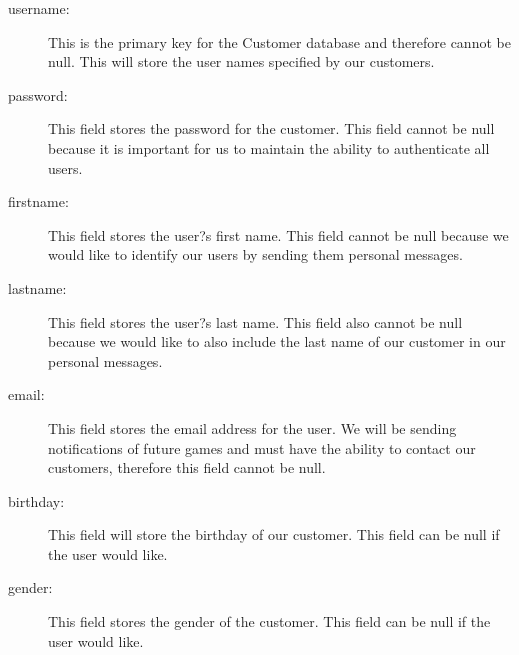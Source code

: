 \begin{description}
    \item[username:] This is the primary key for the Customer database and therefore cannot be null. This will store the user names specified by our customers.
    \item[password:] This field stores the password for the customer. This field cannot be null because it is important for us to maintain the ability to authenticate all users.
    \item[firstname:] This field stores the user?s first name. This field cannot be null because we would like to identify our users by sending them personal messages.
    \item[lastname:] This field stores the user?s last name. This field also cannot be null because we would like to also include the last name of our customer in our personal messages.
    \item[email:] This field stores the email address for the user. We will be sending notifications of future games and must have the ability to contact our customers, therefore this field cannot be null.
	\item[birthday:] This field will store the birthday of our customer. This field can be null if the user would like.
	\item[gender:] This field stores the gender of the customer. This field can be null if the user would like.
\end{description}

